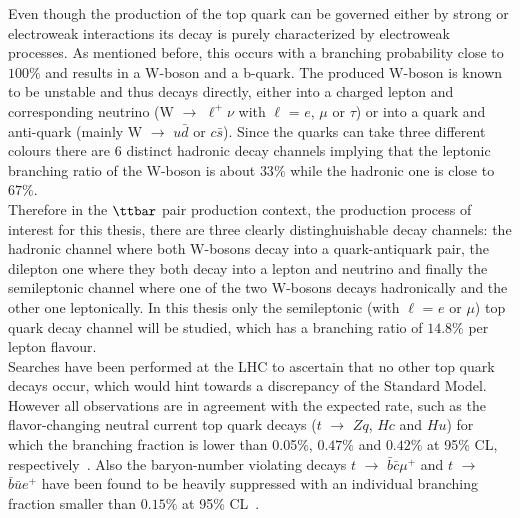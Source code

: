 Even though the production of the top quark can be governed either by strong or electroweak interactions its decay is purely characterized by electroweak processes. As mentioned before, this occurs with a branching probability close to $100\%$ and results in a W-boson and a b-quark. 
The produced W-boson is known to be unstable and thus decays directly, either into a charged lepton and corresponding neutrino (W $\rightarrow$ $\ell^{+}\nu$ with $\ell$ = $e$, $\mu$ or $\tau$) or into a quark and anti-quark (mainly W $\rightarrow$ $u\bar{d}$ or $c\bar{s}$). 
Since the quarks can take three different colours there are 6 distinct hadronic decay channels implying that the leptonic branching ratio of the W-boson is about $33\%$ while the hadronic one is close to $67\%$. %
\\
Therefore in the $\ttbar$ pair production context, the production process of interest for this thesis, there are three clearly distinghuishable decay channels: the hadronic channel where both W-bosons decay into a quark-antiquark pair, the dilepton one where they both decay into a lepton and neutrino and finally the semileptonic channel where one of the two W-bosons decays hadronically and the other one leptonically. In this thesis only the semileptonic (with $\ell$ = $e$ or $\mu$) top quark decay channel will be studied, which has a branching ratio of $14.8\%$ per lepton flavour.
\\
Searches have been performed at the LHC to ascertain that no other top quark decays occur, which would hint towards a discrepancy of the Standard Model. However all observations are in agreement with the expected rate, such as the flavor-changing neutral current top quark decays ($t$ $\rightarrow$ $Zq$, $Hc$ and $Hu$) for which the branching fraction is lower than 0.05$\%$, $0.47\%$ and $0.42\%$ at 95$\%$ CL, respectively~\cite{CMStZqDecayBR, CMStHqDecayBR}. Also the baryon-number violating decays $t$ $\rightarrow$ $\bar{b}\bar{c}\mu^{+}$ and $t$ $\rightarrow$ $\bar{b}\bar{u} e^{+}$ have been found to be heavily suppressed with an individual branching fraction smaller than $0.15\%$ at 95\% CL~\cite{CMSBNVDecayBR}.
\\

